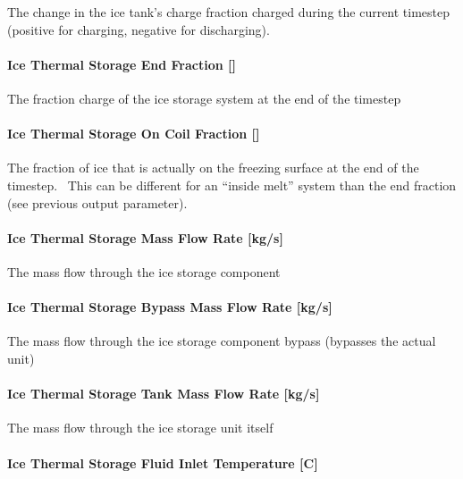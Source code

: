 The change in the ice tank's charge fraction charged during the current timestep (positive for charging, negative for discharging).

\paragraph{Ice Thermal Storage End Fraction {[]}}\label{ice-thermal-storage-end-fraction-1}

The fraction charge of the ice storage system at the end of the timestep

\paragraph{Ice Thermal Storage On Coil Fraction {[]}}\label{ice-thermal-storage-on-coil-fraction}

The fraction of ice that is actually on the freezing surface at the end of the timestep.~ This can be different for an ``inside melt'' system than the end fraction (see previous output parameter).

\paragraph{Ice Thermal Storage Mass Flow Rate {[}kg/s{]}}\label{ice-thermal-storage-mass-flow-rate-kgs-1}

The mass flow through the ice storage component

\paragraph{Ice Thermal Storage Bypass Mass Flow Rate {[}kg/s{]}}\label{ice-thermal-storage-bypass-mass-flow-rate-kgs}

The mass flow through the ice storage component bypass (bypasses the actual unit)

\paragraph{Ice Thermal Storage Tank Mass Flow Rate {[}kg/s{]}}\label{ice-thermal-storage-tank-mass-flow-rate-kgs}

The mass flow through the ice storage unit itself

\paragraph{Ice Thermal Storage Fluid Inlet Temperature {[}C{]}}\label{ice-thermal-storage-fluid-inlet-temperature-c}

